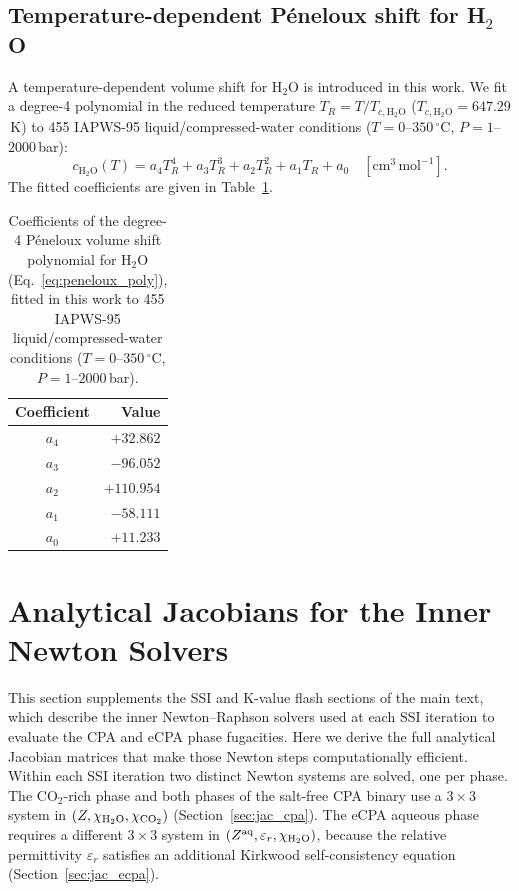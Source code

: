\documentclass[preprint,12pt,number]{elsarticle}
\begin{document}
\subsection*{Temperature-dependent Péneloux shift for H$_2$O}
\label{sec:peneloux_coeffs}

A temperature-dependent volume shift for H$_2$O is introduced in this work.
We fit a degree-4 polynomial in the reduced temperature
$T_R = T / T_{c,\text{H}_2\text{O}}$ ($T_{c,\text{H}_2\text{O}} = 647.29$\,K)
to 455 IAPWS-95 liquid/compressed-water conditions
($T = 0$--$350\,^\circ$C, $P = 1$--$2000$\,bar):
\begin{equation}
  c_{\text{H}_2\text{O}}(T) = a_4 T_R^4 + a_3 T_R^3 + a_2 T_R^2 + a_1 T_R + a_0
  \quad [\text{cm}^3\,\text{mol}^{-1}].
  \label{eq:peneloux_poly}
\end{equation}
The fitted coefficients are given in Table~\ref{tab:peneloux_coeffs}.

\begin{table}[H]
  \centering
  \caption{Coefficients of the degree-4 Péneloux volume shift polynomial for H$_2$O
           (Eq.~\ref{eq:peneloux_poly}), fitted in this work to 455 IAPWS-95 liquid/compressed-water
           conditions ($T = 0$--$350\,^\circ$C, $P = 1$--$2000$\,bar).}
  \label{tab:peneloux_coeffs}
  \begin{tabular}{cr}
    \toprule
    Coefficient & Value \\
    \midrule
    $a_4$ & $+32.862$ \\
    $a_3$ & $-96.052$ \\
    $a_2$ & $+110.954$ \\
    $a_1$ & $-58.111$ \\
    $a_0$ & $+11.233$ \\
    \bottomrule
  \end{tabular}
\end{table}

\section{Analytical Jacobians for the Inner Newton Solvers}
\label{sec:jacobians}

This section supplements the SSI and K-value flash sections of the main text,
which describe the inner Newton--Raphson solvers used at each SSI iteration to evaluate
the CPA and eCPA phase fugacities.
Here we derive the full analytical Jacobian matrices that make those Newton steps
computationally efficient.
Within each SSI iteration two distinct Newton systems are solved, one per phase.
The CO$_2$-rich phase and both phases of the salt-free CPA binary use a
$3\times 3$ system in $(Z,\chi_{\rm H_2O},\chi_{\rm CO_2})$ (Section~\ref{sec:jac_cpa}).
The eCPA aqueous phase requires a different $3\times 3$ system in
$(Z^{\rm aq},\varepsilon_r,\chi_{\rm H_2O})$, because the relative permittivity $\varepsilon_r$
satisfies an additional Kirkwood self-consistency equation
(Section~\ref{sec:jac_ecpa}).
\end{document}
